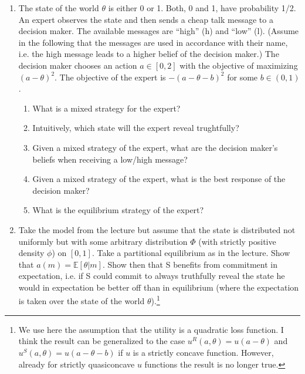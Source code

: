 \documentclass[a4paper,12pt]{article}
\begin{document}
\begin{enumerate}
\item The state of the world $\theta $ is either 0 or 1. Both, 0 and 1, have probability 1/2. An expert observes the state and then sends a cheap talk message to a decision maker. The available messages are ``high'' (h) and ``low'' (l). (Assume in the following that the messages are used in accordance with their name, i.e. the high message leads to a higher belief of the decision maker.) The decision maker chooses an action $a\in [0,2]$ with the objective of maximizing $(a-\theta )^2$. The objective of the expert is $-(a-\theta-b)^2$ for some $b\in(0,1)$.
  \begin{enumerate}
  \item What is a mixed strategy for the expert? %
    \item Intuitively, which state will the expert reveal trughtfully? %
    \item Given a mixed strategy of the expert, what are the decision maker's beliefs when receiving a low/high message? %
      \item Given a mixed strategy of the expert, what is the best response of the decision maker? %
      \item What is the equilibrium strategy of the expert? %
      \end{enumerate}
    \item Take the model from the lecture but assume that the state is distributed not uniformly but with some arbitrary distribution $\Phi$ (with strictly positive density $\phi$) on $[0,1]$. Take a partitional equilibrium as in the lecture. Show that $a(m)=\mathbb{E}[\theta |m]$. Show then that S benefits from commitment in expectation, i.e. if S could commit to always truthfully reveal the state he would in expectation be better off than in equilibrium (where the expectation is taken over the state of the world $\theta $).\footnote{We use here the assumption that the utility is a quadratic loss function. I think the result can be generalized to the case $u^R(a,\theta )=u(a-\theta)$ and $u^S(a,\theta )=u(a-\theta -b)$ if $u$ is a strictly concave function. However, already for strictly quasiconcave $u$ functions the result is no longer true. }

\end{enumerate}
\end{document}
